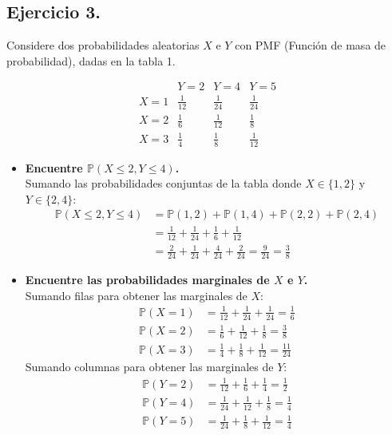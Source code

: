 \documentclass[10pt,a4paper]{book}
\begin{document}
\newpage

\subsection{Ejercicio 3.} Considere dos probabilidades aleatorias $X$ e $Y$ con PMF (Función de masa de probabilidad), dadas en la tabla 1.

\[
\begin{array}{c|c|c|c}
 & Y= 2 & Y=4 & Y=5 \\
\hline
X=1 & \frac{1}{12} & \frac{1}{24} & \frac{1}{24} \\
X=2 & \frac{1}{6} & \frac{1}{12} & \frac{1}{8} \\
X=3 & \frac{1}{4} & \frac{1}{8} & \frac{1}{12}
\end{array}
\]

\begin{itemize}
    \item[\textbf{a)}] \textbf{Encuentre $\mathbb{P}(X \le 2, Y \le 4)$.} \\
    Sumando las probabilidades conjuntas de la tabla donde $X \in \{1, 2\}$ y $Y \in \{2, 4\}$:
    \begin{align*}
        \mathbb{P}(X \le 2, Y \le 4) &= \mathbb{P}(1, 2) + \mathbb{P}(1, 4) + \mathbb{P}(2, 2) + \mathbb{P}(2, 4) \\
        &= \frac{1}{12} + \frac{1}{24} + \frac{1}{6} + \frac{1}{12} \\
        &= \frac{2}{24} + \frac{1}{24} + \frac{4}{24} + \frac{2}{24} = \frac{9}{24} = \frac{3}{8}
    \end{align*}

    \item[\textbf{b)}] \textbf{Encuentre las probabilidades marginales de $X$ e $Y$.} \\
    Sumando filas para obtener las marginales de $X$:
    \begin{align*}
        \mathbb{P}(X=1) &= \frac{1}{12} + \frac{1}{24} + \frac{1}{24} = \frac{1}{6} \\
        \mathbb{P}(X=2) &= \frac{1}{6} + \frac{1}{12} + \frac{1}{8} = \frac{3}{8} \\
        \mathbb{P}(X=3) &= \frac{1}{4} + \frac{1}{8} + \frac{1}{12} = \frac{11}{24}
    \end{align*}
    Sumando columnas para obtener las marginales de $Y$:
    \begin{align*}
        \mathbb{P}(Y=2) &= \frac{1}{12} + \frac{1}{6} + \frac{1}{4} = \frac{1}{2} \\
        \mathbb{P}(Y=4) &= \frac{1}{24} + \frac{1}{12} + \frac{1}{8} = \frac{1}{4} \\
        \mathbb{P}(Y=5) &= \frac{1}{24} + \frac{1}{8} + \frac{1}{12} = \frac{1}{4}
    \end{align*}


\end{itemize}
\end{document}

